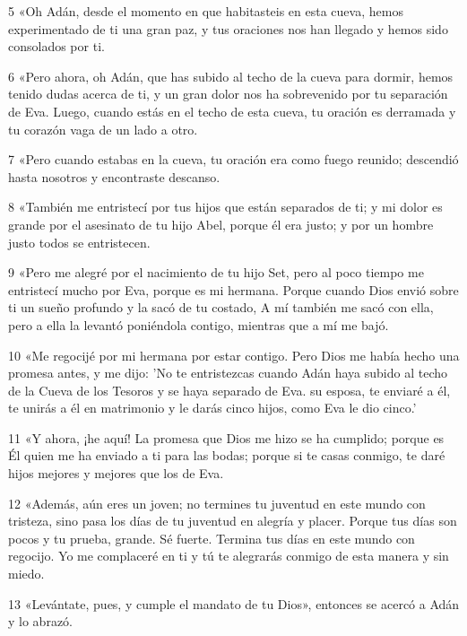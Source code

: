 \par 5 «Oh Adán, desde el momento en que habitasteis en esta cueva, hemos experimentado de ti una gran paz, y tus oraciones nos han llegado y hemos sido consolados por ti.

\par 6 «Pero ahora, oh Adán, que has subido al techo de la cueva para dormir, hemos tenido dudas acerca de ti, y un gran dolor nos ha sobrevenido por tu separación de Eva. Luego, cuando estás en el techo de esta cueva, tu oración es derramada y tu corazón vaga de un lado a otro.

\par 7 «Pero cuando estabas en la cueva, tu oración era como fuego reunido; descendió hasta nosotros y encontraste descanso.

\par 8 «También me entristecí por tus hijos que están separados de ti; y mi dolor es grande por el asesinato de tu hijo Abel, porque él era justo; y por un hombre justo todos se entristecen.

\par 9 «Pero me alegré por el nacimiento de tu hijo Set, pero al poco tiempo me entristecí mucho por Eva, porque es mi hermana. Porque cuando Dios envió sobre ti un sueño profundo y la sacó de tu costado, A mí también me sacó con ella, pero a ella la levantó poniéndola contigo, mientras que a mí me bajó.

\par 10 «Me regocijé por mi hermana por estar contigo. Pero Dios me había hecho una promesa antes, y me dijo: 'No te entristezcas cuando Adán haya subido al techo de la Cueva de los Tesoros y se haya separado de Eva. su esposa, te enviaré a él, te unirás a él en matrimonio y le darás cinco hijos, como Eva le dio cinco.'

\par 11 «Y ahora, ¡he aquí! La promesa que Dios me hizo se ha cumplido; porque es Él quien me ha enviado a ti para las bodas; porque si te casas conmigo, te daré hijos mejores y mejores que los de Eva.

\par 12 «Además, aún eres un joven; no termines tu juventud en este mundo con tristeza, sino pasa los días de tu juventud en alegría y placer. Porque tus días son pocos y tu prueba, grande. Sé fuerte. Termina tus días en este mundo con regocijo. Yo me complaceré en ti y tú te alegrarás conmigo de esta manera y sin miedo.

\par 13 «Levántate, pues, y cumple el mandato de tu Dios», entonces se acercó a Adán y lo abrazó.

